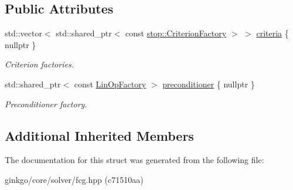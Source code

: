 \subsection*{Public Attributes}
\begin{DoxyCompactItemize}
\item 
\mbox{\label{structgko_1_1solver_1_1Fcg_1_1parameters__type_a4d322d51e9c1908b97a868746c191683}} 
std\+::vector$<$ std\+::shared\+\_\+ptr$<$ const \hyperlink{namespacegko_1_1stop_ab12a51109c50b35ec36dc5a393d6a9a0}{stop\+::\+Criterion\+Factory} $>$ $>$ \hyperlink{structgko_1_1solver_1_1Fcg_1_1parameters__type_a4d322d51e9c1908b97a868746c191683}{criteria} \{ nullptr \}
\begin{DoxyCompactList}\small\item\em Criterion factories. \end{DoxyCompactList}\item 
\mbox{\label{structgko_1_1solver_1_1Fcg_1_1parameters__type_afbdb7787925ef4294b12fe6851cfafd4}} 
std\+::shared\+\_\+ptr$<$ const \hyperlink{classgko_1_1LinOpFactory}{Lin\+Op\+Factory} $>$ \hyperlink{structgko_1_1solver_1_1Fcg_1_1parameters__type_afbdb7787925ef4294b12fe6851cfafd4}{preconditioner} \{ nullptr \}
\begin{DoxyCompactList}\small\item\em Preconditioner factory. \end{DoxyCompactList}\end{DoxyCompactItemize}
\subsection*{Additional Inherited Members}


The documentation for this struct was generated from the following file\+:\begin{DoxyCompactItemize}
\item 
ginkgo/core/solver/fcg.\+hpp (c71510aa)\end{DoxyCompactItemize}

